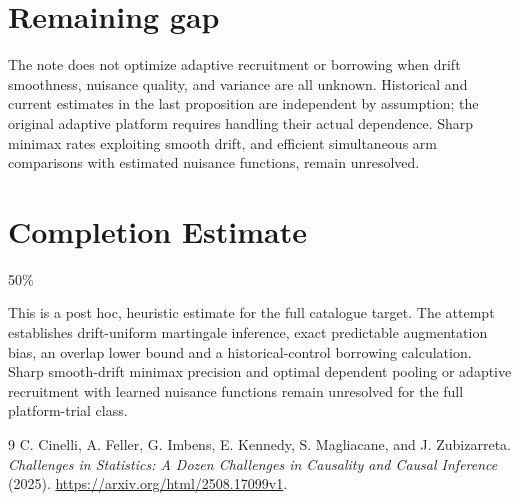 \documentclass[11pt]{article}
\theoremstyle{remark}
\begin{document}
\section*{Remaining gap}
The note does not optimize adaptive recruitment or borrowing when drift smoothness, nuisance quality, and variance are all unknown. Historical and current estimates in the last proposition are independent by assumption; the original adaptive platform requires handling their actual dependence. Sharp minimax rates exploiting smooth drift, and efficient simultaneous arm comparisons with estimated nuisance functions, remain unresolved.

\section{Completion Estimate}
50\%

This is a post hoc, heuristic estimate for the full catalogue target.
The attempt establishes drift-uniform martingale inference, exact predictable augmentation bias, an overlap lower bound and a historical-control borrowing calculation. Sharp smooth-drift minimax precision and optimal dependent pooling or adaptive recruitment with learned nuisance functions remain unresolved for the full platform-trial class.

\begin{thebibliography}{9}
 C. Cinelli, A. Feller, G. Imbens, E. Kennedy, S. Magliacane, and J. Zubizarreta. \emph{Challenges in Statistics: A Dozen Challenges in Causality and Causal Inference} (2025). \url{https://arxiv.org/html/2508.17099v1}.
\end{thebibliography}
\end{document}
